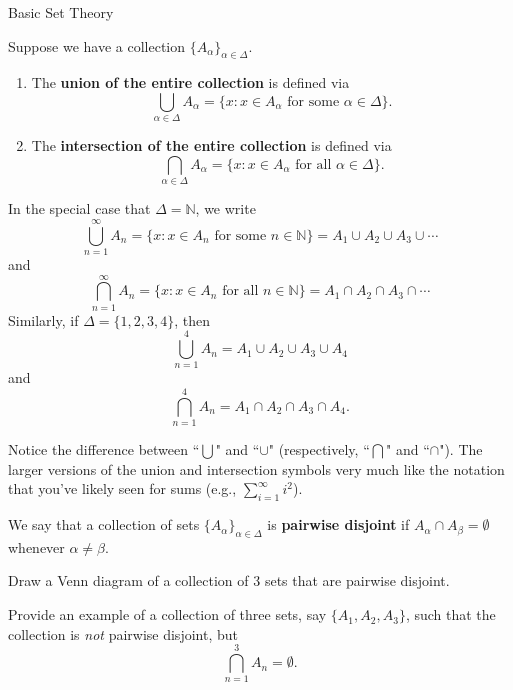 \begin{section}{Basic Set Theory}
\begin{definition}
Suppose we have a collection $\{A_{\alpha}\}_{\alpha\in\Delta}$.

\begin{enumerate}
\item The \textbf{union of the entire collection} is defined via
\[
\bigcup_{\alpha\in\Delta} A_{\alpha}=\{x:x\in A_{\alpha} \mbox{ for some }\alpha\in \Delta\}.
\]

\item The \textbf{intersection of the entire collection} is defined via
\[
\bigcap_{\alpha\in\Delta} A_{\alpha}=\{x:x\in A_{\alpha} \mbox{ for all }\alpha\in \Delta\}.
\]
\end{enumerate}
\end{definition}

\begin{example} 
In the special case that $\Delta=\mathbb{N}$, we write
\[
\bigcup_{n=1}^{\infty}A_n= \{ x : x \in A_n \mbox{ for some } n \in \mathbb{N}\}= A_1\cup A_2 \cup A_3 \cup \cdots
\] 
and
\[
\bigcap_{n=1}^{\infty}A_n= \{ x : x \in A_n \mbox{ for all } n \in \mathbb{N}\} = A_1\cap A_2 \cap A_3 \cap \cdots
\] 
Similarly, if $\Delta=\{1,2,3,4\}$, then
\[
\bigcup_{n=1}^{4}A_n= A_1\cup A_2 \cup A_3 \cup A_4
\] 
and
\[
\bigcap_{n=1}^{4}A_n= A_1\cap A_2 \cap A_3 \cap A_4.
\] 
\end{example}

\begin{remark}
Notice the difference between ``$\bigcup$" and ``$\cup$" (respectively, ``$\bigcap$" and ``$\cap$").  The larger versions of the union and intersection symbols very much like the notation that you've likely seen for sums (e.g., $\displaystyle \sum_{i=1}^\infty i^2$).
\end{remark}

\begin{definition}
We say that a collection of sets $\{A_{\alpha}\}_{\alpha\in\Delta}$ is \textbf{pairwise disjoint} if $A_{\alpha} \cap A_{\beta}=\emptyset$ whenever $\alpha\neq \beta$.
\end{definition}

\begin{exercise}
Draw a Venn diagram of a collection of 3 sets that are pairwise disjoint.
\end{exercise}

\begin{exercise}
Provide an example of a collection of three sets, say $\{A_1, A_2, A_3\}$, such that the collection is \emph{not} pairwise disjoint, but 
\[
\bigcap_{n=1}^3 A_n=\emptyset.
\]
\end{exercise}


\end{section}
